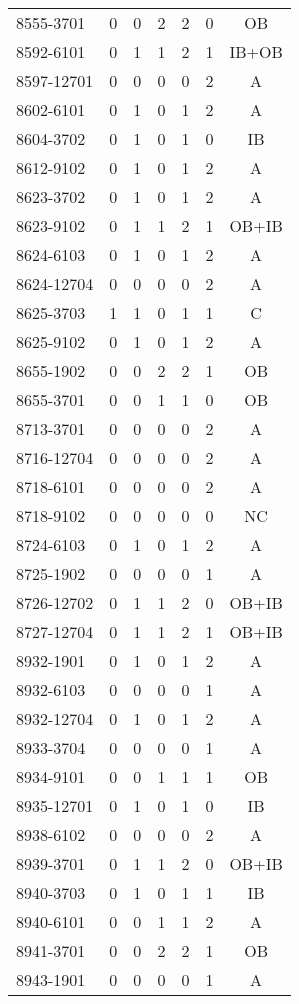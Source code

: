 \begin{longtable}[c]{lcccccc}
8555-3701 & 0 & 0 & 2 & 2 & 0 & OB \\
8592-6101 & 0 & 1 & 1 & 2 & 1 & IB+OB \\
8597-12701 & 0 & 0 & 0 & 0 & 2 & A \\
8602-6101 & 0 & 1 & 0 & 1 & 2 & A \\
8604-3702 & 0 & 1 & 0 & 1 & 0 & IB \\
8612-9102 & 0 & 1 & 0 & 1 & 2 & A \\
8623-3702 & 0 & 1 & 0 & 1 & 2 & A \\
8623-9102 & 0 & 1 & 1 & 2 & 1 & OB+IB \\
8624-6103 & 0 & 1 & 0 & 1 & 2 & A \\
8624-12704 & 0 & 0 & 0 & 0 & 2 & A \\
8625-3703 & 1 & 1 & 0 & 1 & 1 & C \\
8625-9102 & 0 & 1 & 0 & 1 & 2 & A \\
8655-1902 & 0 & 0 & 2 & 2 & 1 & OB \\
8655-3701 & 0 & 0 & 1 & 1 & 0 & OB \\
8713-3701 & 0 & 0 & 0 & 0 & 2 & A \\
8716-12704 & 0 & 0 & 0 & 0 & 2 & A \\
8718-6101 & 0 & 0 & 0 & 0 & 2 & A \\
8718-9102 & 0 & 0 & 0 & 0 & 0 & NC \\
8724-6103 & 0 & 1 & 0 & 1 & 2 & A \\
8725-1902 & 0 & 0 & 0 & 0 & 1 & A \\
8726-12702 & 0 & 1 & 1 & 2 & 0 & OB+IB \\
8727-12704 & 0 & 1 & 1 & 2 & 1 & OB+IB \\
8932-1901 & 0 & 1 & 0 & 1 & 2 & A \\
8932-6103 & 0 & 0 & 0 & 0 & 1 & A \\
8932-12704 & 0 & 1 & 0 & 1 & 2 & A \\
8933-3704 & 0 & 0 & 0 & 0 & 1 & A \\
8934-9101 & 0 & 0 & 1 & 1 & 1 & OB \\
8935-12701 & 0 & 1 & 0 & 1 & 0 & IB \\
8938-6102 & 0 & 0 & 0 & 0 & 2 & A \\
8939-3701 & 0 & 1 & 1 & 2 & 0 & OB+IB \\
8940-3703 & 0 & 1 & 0 & 1 & 1 & IB \\
8940-6101 & 0 & 0 & 1 & 1 & 2 & A \\
8941-3701 & 0 & 0 & 2 & 2 & 1 & OB \\
8943-1901 & 0 & 0 & 0 & 0 & 1 & A \\

\end{longtable}
